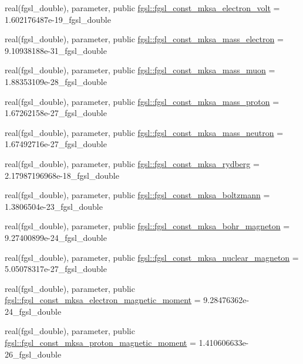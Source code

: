 \begin{DoxyCompactItemize}
\item 
real(fgsl\+\_\+double), parameter, public \hyperlink{namespacefgsl_a2b715db04903e667b5f50d6df3054bee}{fgsl\+::fgsl\+\_\+const\+\_\+mksa\+\_\+electron\+\_\+volt} = 1.\+602176487e-\/19\+\_\+fgsl\+\_\+double
\item 
real(fgsl\+\_\+double), parameter, public \hyperlink{namespacefgsl_a9b37f99c3856817b93dd18bc94b81725}{fgsl\+::fgsl\+\_\+const\+\_\+mksa\+\_\+mass\+\_\+electron} = 9.\+10938188e-\/31\+\_\+fgsl\+\_\+double
\item 
real(fgsl\+\_\+double), parameter, public \hyperlink{namespacefgsl_afcace800f07f1c2e9703336d2ff02ba4}{fgsl\+::fgsl\+\_\+const\+\_\+mksa\+\_\+mass\+\_\+muon} = 1.\+88353109e-\/28\+\_\+fgsl\+\_\+double
\item 
real(fgsl\+\_\+double), parameter, public \hyperlink{namespacefgsl_a9b4432f549e95747550b45df3417757f}{fgsl\+::fgsl\+\_\+const\+\_\+mksa\+\_\+mass\+\_\+proton} = 1.\+67262158e-\/27\+\_\+fgsl\+\_\+double
\item 
real(fgsl\+\_\+double), parameter, public \hyperlink{namespacefgsl_a4480f5ff7a83600820b4cdaa8aff929e}{fgsl\+::fgsl\+\_\+const\+\_\+mksa\+\_\+mass\+\_\+neutron} = 1.\+67492716e-\/27\+\_\+fgsl\+\_\+double
\item 
real(fgsl\+\_\+double), parameter, public \hyperlink{namespacefgsl_a06f564b1101469e9756b3bb20be06b16}{fgsl\+::fgsl\+\_\+const\+\_\+mksa\+\_\+rydberg} = 2.\+17987196968e-\/18\+\_\+fgsl\+\_\+double
\item 
real(fgsl\+\_\+double), parameter, public \hyperlink{namespacefgsl_aee3fe8b4260b1d34436e9f66707b773e}{fgsl\+::fgsl\+\_\+const\+\_\+mksa\+\_\+boltzmann} = 1.\+3806504e-\/23\+\_\+fgsl\+\_\+double
\item 
real(fgsl\+\_\+double), parameter, public \hyperlink{namespacefgsl_afa92cd1a7ffe8a0106c3ae29720b0f84}{fgsl\+::fgsl\+\_\+const\+\_\+mksa\+\_\+bohr\+\_\+magneton} = 9.\+27400899e-\/24\+\_\+fgsl\+\_\+double
\item 
real(fgsl\+\_\+double), parameter, public \hyperlink{namespacefgsl_a01a0e11a78d0097f8c8a170dbea03e3f}{fgsl\+::fgsl\+\_\+const\+\_\+mksa\+\_\+nuclear\+\_\+magneton} = 5.\+05078317e-\/27\+\_\+fgsl\+\_\+double
\item 
real(fgsl\+\_\+double), parameter, public \hyperlink{namespacefgsl_ae360dd0b55b309065855f8521a316e0f}{fgsl\+::fgsl\+\_\+const\+\_\+mksa\+\_\+electron\+\_\+magnetic\+\_\+moment} = 9.\+28476362e-\/24\+\_\+fgsl\+\_\+double
\item 
real(fgsl\+\_\+double), parameter, public \hyperlink{namespacefgsl_a11b01d727e4e01028200e21ced0e16c2}{fgsl\+::fgsl\+\_\+const\+\_\+mksa\+\_\+proton\+\_\+magnetic\+\_\+moment} = 1.\+410606633e-\/26\+\_\+fgsl\+\_\+double

\end{DoxyCompactItemize}
